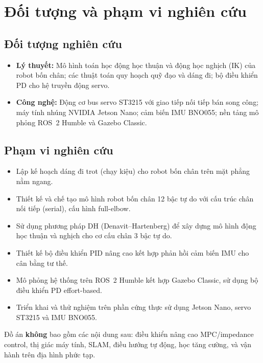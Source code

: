 \section{Đối tượng và phạm vi nghiên cứu}

\subsection{Đối tượng nghiên cứu}

\begin{itemize}
    \item \textbf{Lý thuyết:} Mô hình toán học động học thuận và động học nghịch (IK) của robot bốn chân; các thuật toán quy hoạch quỹ đạo và dáng đi; bộ điều khiển PD cho hệ truyền động servo.
    \item \textbf{Công nghệ:} Động cơ bus servo ST3215 với giao tiếp nối tiếp bán song công; máy tính nhúng NVIDIA Jetson Nano; cảm biến IMU BNO055; nền tảng mô phỏng ROS~2 Humble và Gazebo Classic.
\end{itemize}

\subsection{Phạm vi nghiên cứu}

\begin{itemize}
    \item Lập kế hoạch dáng đi trot (chạy kiệu) cho robot bốn chân trên mặt phẳng nằm ngang.
    \item Thiết kế và chế tạo mô hình robot bốn chân 12 bậc tự do với cấu trúc chân nối tiếp (serial), cấu hình full-elbow.
    \item Sử dụng phương pháp DH (Denavit--Hartenberg) để xây dựng mô hình động học thuận và nghịch cho cơ cấu chân 3 bậc tự do.
    \item Thiết kế bộ điều khiển PID nâng cao kết hợp phản hồi cảm biến IMU cho cân bằng tư thế.
    \item Mô phỏng hệ thống trên ROS~2 Humble kết hợp Gazebo Classic, sử dụng bộ điều khiển PD effort-based.
    \item Triển khai và thử nghiệm trên phần cứng thực sử dụng Jetson Nano, servo ST3215 và IMU BNO055.
\end{itemize}

Đồ án \textbf{không} bao gồm các nội dung sau: điều khiển nâng cao MPC/impedance control, thị giác máy tính, SLAM, điều hướng tự động, học tăng cường, và vận hành trên địa hình phức tạp.


